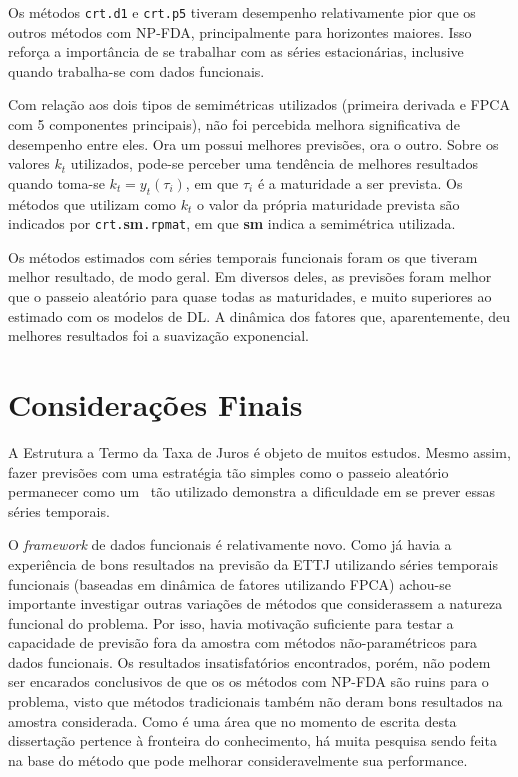 \documentclass[
	12pt,				%
	openright,			%
	oneside,			%
	a4paper,			%
	english,			%
	brazil				%
	]{dissertacao-ufrgs-abntex2}
\begin{document}
Os métodos \texttt{crt.d1} e \texttt{crt.p5} tiveram desempenho relativamente pior que os outros métodos com NP-FDA, principalmente para horizontes maiores. Isso reforça a importância de se trabalhar com as séries estacionárias, inclusive quando trabalha-se com dados funcionais. 

Com relação aos dois tipos de semimétricas utilizados (primeira derivada e FPCA com 5 componentes principais), não foi percebida melhora significativa de desempenho entre eles. Ora um possui melhores previsões, ora o outro. Sobre os valores $k_t$ utilizados, pode-se perceber uma tendência de melhores resultados quando toma-se $k_t = y_t(\tau_i)$, em que $\tau_i$ é a maturidade a ser prevista. Os métodos que utilizam como $k_t$ o valor da própria maturidade prevista são indicados por \texttt{crt.}\textbf{sm}\texttt{.rpmat}, em que \textbf{sm} indica a semimétrica utilizada.

Os métodos estimados com séries temporais funcionais foram os que tiveram melhor resultado, de modo geral. Em diversos deles, as previsões foram melhor que o passeio aleatório para quase todas as maturidades, e muito superiores ao estimado com os modelos de DL. A dinâmica dos fatores que, aparentemente, deu melhores resultados foi a suavização exponencial. 

\chapter*[Conclusão]{Considerações Finais} \label{ch:conclusao}

A Estrutura a Termo da Taxa de Juros é objeto de muitos estudos. Mesmo assim, fazer previsões com uma estratégia tão simples como o passeio aleatório permanecer como um \bm~tão utilizado demonstra a dificuldade em se prever essas séries temporais.

O \emph{framework} de dados funcionais é relativamente novo. Como já havia a experiência de bons resultados na previsão da ETTJ utilizando séries temporais funcionais (baseadas em dinâmica de fatores utilizando FPCA) achou-se importante investigar outras variações de métodos que considerassem a natureza funcional do problema. 
Por isso, havia motivação suficiente para testar a capacidade de previsão fora da amostra com métodos não-paramétricos para dados funcionais. 
Os resultados insatisfatórios encontrados, porém, não podem ser encarados conclusivos de que os os métodos com NP-FDA são ruins para o problema, visto que métodos tradicionais também não deram bons resultados na amostra considerada. Como é uma área que no momento de escrita desta dissertação pertence à fronteira do conhecimento, há muita pesquisa sendo feita na base do método que pode melhorar consideravelmente sua performance. 
\end{document}
